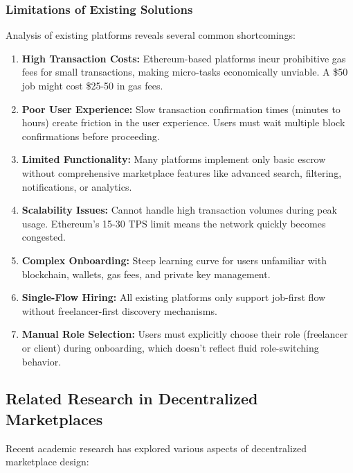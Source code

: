 \documentclass[a4paper,13pt,twoside]{report}
\theoremstyle{definition}
\begin{document}
\subsubsection{Limitations of Existing Solutions}

Analysis of existing platforms reveals several common shortcomings:

\begin{enumerate}
    \item \textbf{High Transaction Costs:} Ethereum-based platforms incur prohibitive gas fees for small transactions, making micro-tasks economically unviable. A \$50 job might cost \$25-50 in gas fees.

    \item \textbf{Poor User Experience:} Slow transaction confirmation times (minutes to hours) create friction in the user experience. Users must wait multiple block confirmations before proceeding.

    \item \textbf{Limited Functionality:} Many platforms implement only basic escrow without comprehensive marketplace features like advanced search, filtering, notifications, or analytics.

    \item \textbf{Scalability Issues:} Cannot handle high transaction volumes during peak usage. Ethereum's 15-30 TPS limit means the network quickly becomes congested.

    \item \textbf{Complex Onboarding:} Steep learning curve for users unfamiliar with blockchain, wallets, gas fees, and private key management.

    \item \textbf{Single-Flow Hiring:} All existing platforms only support job-first flow without freelancer-first discovery mechanisms.

    \item \textbf{Manual Role Selection:} Users must explicitly choose their role (freelancer or client) during onboarding, which doesn't reflect fluid role-switching behavior.
\end{enumerate}

\subsection{Related Research in Decentralized Marketplaces}

Recent academic research has explored various aspects of decentralized marketplace design:
\end{document}
